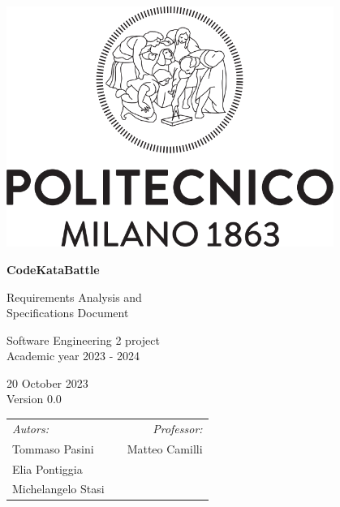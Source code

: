 
\begin{titlepage}
    \begin{center}
        \includegraphics[width=0.8\textwidth]{images/PoliMi_Logo.png}

        \vspace*{1cm}
        \textbf{\huge CodeKataBattle}

        \vspace{0.5cm}
        \LARGE Requirements Analysis and\\Specifications Document

        \vspace{1.5cm}
        \normalsize Software Engineering 2 project\\
        Academic year 2023 - 2024

        \vspace{0.5cm}
        20 October 2023\\
        Version 0.0

        \vspace{1.5cm}
        \small
        \begin{table}[b]
            \begin{tabular}{l p{5.5cm} l}
                \textit{Autors:}   &  & \multicolumn{1}{r}{\textit{Professor:}} \\
                Tommaso Pasini     &  & \multicolumn{1}{r}{Matteo Camilli}      \\
                Elia Pontiggia     &  & \textbf{}                               \\
                Michelangelo Stasi &  & \textbf{}
            \end{tabular}
        \end{table}

    \end{center}
\end{titlepage}